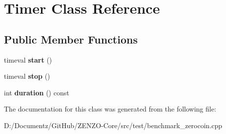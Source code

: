 \hypertarget{class_timer}{}\section{Timer Class Reference}
\label{class_timer}
\subsection*{Public Member Functions}
\begin{DoxyCompactItemize}
\item 
\mbox{\label{class_timer_adcc2a315e6a05332a9f6eeef3fad706b}} 
timeval {\bfseries start} ()
\item 
\mbox{\label{class_timer_a2e08b7392107f224dc5bbc8e1dcfa124}} 
timeval {\bfseries stop} ()
\item 
\mbox{\label{class_timer_aed895ee071f6a2cde1fc25e57159bb5f}} 
int {\bfseries duration} () const
\end{DoxyCompactItemize}


The documentation for this class was generated from the following file\+:\begin{DoxyCompactItemize}
\item 
D\+:/\+Documentz/\+Git\+Hub/\+Z\+E\+N\+Z\+O-\/\+Core/src/test/benchmark\+\_\+zerocoin.\+cpp\end{DoxyCompactItemize}
